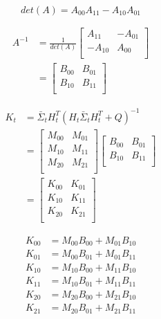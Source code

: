 \documentclass[oneside, 12pt, a4paper]{book}
\begin{document}
\begin{equation}
    {det}(A) = A_{00}A_{11} - A_{10}A_{01}
\end{equation}

\begin{equation}
    \begin{split}
    A^{-1} &= \frac{1}{det(A)} 
    \begin{bmatrix}
        A_{11} & -A_{01}\\
        -A_{10} & A_{00}\\ 
    \end{bmatrix}\\
    &=
    \begin{bmatrix}
        B_{00} & B_{01}\\
        B_{10} & B_{11}\\ 
    \end{bmatrix}
    \end{split}
\end{equation}


\begin{equation}
    \begin{split}
        K_t &= \bar{\Sigma}_t H_t^T(H_t \bar{\Sigma}_t H_t^T + Q)^{-1} \\ 
        &=
        \begin{bmatrix}
            M_{00} & M_{01}\\
            M_{10} & M_{11}\\ 
            M_{20} & M_{21}\\
        \end{bmatrix} 
        \begin{bmatrix}
            B_{00} & B_{01}\\
            B_{10} & B_{11}\\ 
        \end{bmatrix}\\
        &=
        \begin{bmatrix}
            K_{00} & K_{01}\\
            K_{10} & K_{11}\\ 
            K_{20} & K_{21}\\
        \end{bmatrix} 
    \end{split}
\end{equation}

\begin{equation}
    \begin{split}
        K_{00} &= M_{00}B_{00} + M_{01}B_{10} \\
        K_{01} &= M_{00}B_{01} + M_{01}B_{11} \\
        K_{10} &= M_{10}B_{00} + M_{11}B_{10} \\
        K_{11} &= M_{10}B_{01} + M_{11}B_{11} \\
        K_{20} &= M_{20}B_{00} + M_{21}B_{10} \\
        K_{21} &= M_{20}B_{01} + M_{21}B_{11}
    \end{split}
\end{equation}
\end{document}
